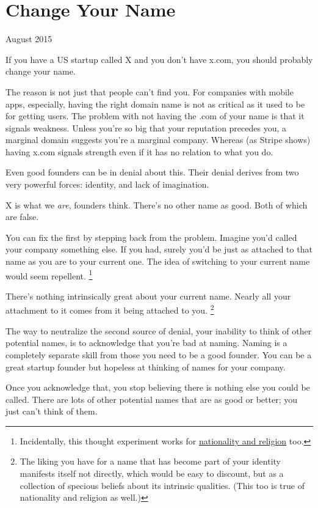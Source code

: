 \documentclass[12pt]{book}
\begin{document}
\chapter{Change Your Name}

August 2015

If you have a US startup called X and you don't have x.com, you should
probably change your name.

The reason is not just that people can't find you. For companies with
mobile apps, especially, having the right domain name is not as critical
as it used to be for getting users. The problem with not having the .com
of your name is that it signals weakness. Unless you're so big that your
reputation precedes you, a marginal domain suggests you're a marginal
company. Whereas (as Stripe shows) having x.com signals strength even if
it has no relation to what you do.

Even good founders can be in denial about this. Their denial derives
from two very powerful forces: identity, and lack of imagination.

X is what we \emph{are}, founders think. There's no other name as good.
Both of which are false.

You can fix the first by stepping back from the problem. Imagine you'd
called your company something else. If you had, surely you'd be just as
attached to that name as you are to your current one. The idea of
switching to your current name would seem repellent.
\footnote{Incidentally, this thought experiment works for
\href{identity.html}{nationality and religion} too.}

There's nothing intrinsically great about your current name. Nearly all
your attachment to it comes from it being attached to you.
\footnote{The liking you have for a name that has become part of your
identity manifests itself not directly, which would be easy to discount,
but as a collection of specious beliefs about its intrinsic qualities.
(This too is true of nationality and religion as well.)}

The way to neutralize the second source of denial, your inability to
think of other potential names, is to acknowledge that you're bad at
naming. Naming is a completely separate skill from those you need to be
a good founder. You can be a great startup founder but hopeless at
thinking of names for your company.

Once you acknowledge that, you stop believing there is nothing else you
could be called. There are lots of other potential names that are as
good or better; you just can't think of them.
\end{document}
